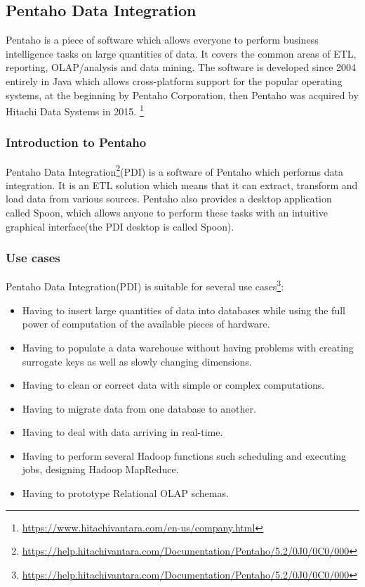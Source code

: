 \documentclass{article}
\begin{document}
\subsection{Pentaho Data Integration}

Pentaho is a piece of software which allows everyone to perform business intelligence tasks on large quantities of data. It covers the common areas of ETL, reporting, OLAP/analysis and data mining. The software is developed since 2004 entirely in Java which allows cross-platform support for the popular operating systems, at the beginning by Pentaho Corporation, then Pentaho was acquired by Hitachi Data Systems in 2015. \footnote{\url{https://www.hitachivantara.com/en-us/company.html}}

\subsubsection{Introduction to Pentaho}

Pentaho Data Integration\footnote{\url{https://help.hitachivantara.com/Documentation/Pentaho/5.2/0J0/0C0/000}}(PDI) is a software of Pentaho which performs data integration. It is an ETL solution which means that it can extract, transform and load data from various sources. Pentaho also provides a desktop application called Spoon, which allows anyone to perform these tasks with an intuitive graphical interface(the PDI desktop is called Spoon).



\subsubsection{Use cases}
Pentaho Data Integration(PDI) is suitable for several use cases\footnote{\url{https://help.hitachivantara.com/Documentation/Pentaho/5.2/0J0/0C0/000}}:

\begin{itemize}
\item Having to insert large quantities of data into databases while using the full power of computation of the available pieces of hardware.
\item Having to populate a data warehouse without having problems with creating surrogate keys as well as slowly changing dimensions.
\item Having to clean or correct data with simple or complex computations.
\item Having to migrate data from one database to another.
\item Having to deal with data arriving in real-time.
\item Having to perform several Hadoop functions such scheduling and executing jobs, designing Hadoop MapReduce.
\item Having to prototype Relational OLAP schemas.
\end{itemize}
\end{document}
